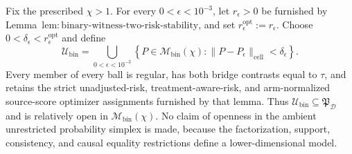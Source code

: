 Fix the prescribed \(\chi>1\).  For every \(0<\epsilon<10^{-3}\), let \(r_\epsilon>0\) be furnished by Lemma~\(\mathrm{lem{:}binary\text{-}witness\text{-}two\text{-}risk\text{-}stability}\), and set \(r_\epsilon^{\mathrm{opt}}:=r_\epsilon\).  Choose \(0<\delta_\epsilon<r_\epsilon^{\mathrm{opt}}\) and define
\[
 \mathcal U_{\mathrm{bin}}
 =\bigcup_{0<\epsilon<10^{-3}}
 \left\{P\in\mathcal M_{\mathrm{bin}}(\chi):
 \|P-P_\epsilon\|_{\mathrm{cell}}<\delta_\epsilon\right\}.
\]
Every member of every ball is regular, has both bridge contrasts equal to \(\tau\), and retains the strict unadjusted-risk, treatment-aware-risk, and arm-normalized source-score optimizer assignments furnished by that lemma.  Thus \(\mathcal U_{\mathrm{bin}}\subseteq\mathfrak P_{\mathcal D}\) and is relatively open in \(\mathcal M_{\mathrm{bin}}(\chi)\).  No claim of openness in the ambient unrestricted probability simplex is made, because the factorization, support, consistency, and causal equality restrictions define a lower-dimensional model.